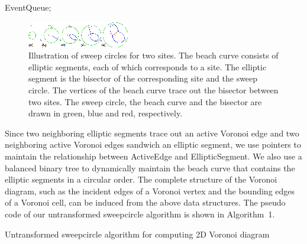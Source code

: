 {{\noindent{} EventQueue;
\begin{figure}[!htbp]
\vspace{-4mm}
\begin{center}
\includegraphics[width=0.95\columnwidth]{figs/sweepcircle/2sites_new.PNG}
\end{center}
\vspace{-0.1in}\caption{Illustration of sweep circles for two sites.
The beach curve consists of elliptic segments, each of which
corresponds to a site. The elliptic segment is the bisector of the
corresponding site and the sweep circle. The vertices of the beach
curve trace out the bisector between two sites. The sweep circle,
the beach curve and the bisector are drawn in green, blue and red,
respectively. } \label{fig:sweepcircleprocess}
\end{figure}

Since two neighboring elliptic segments trace out an active Voronoi
edge and two neighboring active Voronoi edges sandwich an elliptic
segment, we use pointers to maintain the relationship between
ActiveEdge and EllipticSegment. We also use a balanced binary tree
to dynamically maintain the beach curve that contains the elliptic
segments in a circular order. The complete structure of the Voronoi
diagram, such as the incident edges of a Voronoi vertex and the
bounding edges of a Voronoi cell, can be induced from the above data
structures. The pseudo code of our untransformed sweepcircle algorithm is shown
in Algorithm~1.

\begin{algorithm}
\label{alg:pseudocode}
\caption{Untransformed sweepcircle algorithm
for computing 2D Voronoi diagram}
\begin{algorithmic}[1]


\end{algorithmic}
\end{algorithm}}}
